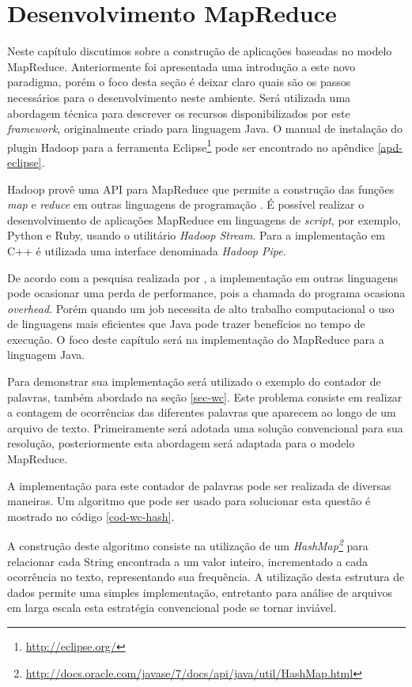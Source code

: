 \chapter{Desenvolvimento MapReduce}
\label{cap:mapreduce-devel}

Neste capítulo discutimos sobre a construção de aplicações baseadas no modelo MapReduce. Anteriormente foi apresentada uma introdução a este novo paradigma, porém o foco desta seção é deixar claro quais são os passos necessários para o desenvolvimento neste ambiente. Será utilizada uma abordagem técnica para descrever os recursos disponibilizados por este \textit{framework}, originalmente criado para linguagem Java. O manual de instalação do plugin Hadoop para a ferramenta Eclipse\footnote{\url{http://eclipse.org/}} pode ser encontrado no apêndice \ref{apd-eclipse}.

Hadoop provê uma API para MapReduce que permite a construção das funções \textit{map} e \textit{reduce} em outras linguagens de programação \cite{white2012}. É possível realizar o desenvolvimento de aplicações MapReduce em linguagens de \textit{script}, por exemplo, Python e Ruby, usando o utilitário \textit{Hadoop Stream}. Para a implementação em C++ é utilizada uma interface denominada \textit{Hadoop Pipe}.

De acordo com a pesquisa realizada por , a implementação em outras linguagens pode ocasionar uma perda de performance, pois a chamada do programa ocasiona \textit{overhead}. Porém quando um job necessita de alto trabalho computacional o uso de linguagens mais eficientes que Java pode trazer benefícios no tempo de execução. O foco deste capítulo será na implementação do MapReduce para a linguagem Java.

Para demonstrar sua implementação será utilizado o exemplo do contador de palavras, também abordado na seção \ref{sec-wc}. Este problema consiste em realizar a contagem de ocorrências das diferentes palavras que aparecem ao longo de um arquivo de texto. Primeiramente será adotada uma solução convencional para sua resolução, posteriormente esta abordagem será adaptada para o modelo MapReduce.

A implementação para este contador de palavras pode ser realizada de diversas maneiras. Um algoritmo que pode ser usado para solucionar esta questão é mostrado no código \ref{cod-wc-hash}.

A construção deste algoritmo consiste na utilização de um \textit{HashMap\footnote{\url{http://docs.oracle.com/javase/7/docs/api/java/util/HashMap.html}}} para relacionar cada String encontrada a um valor inteiro, incrementado a cada ocorrência no texto, representando sua frequência. A utilização desta estrutura de dados permite uma simples implementação, entretanto para análise de arquivos em larga escala esta estratégia convencional pode se tornar inviável.

